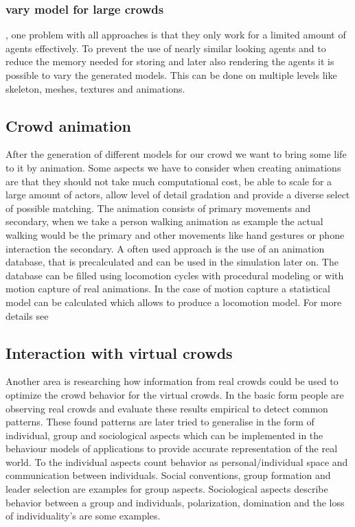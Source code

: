 \documentclass[sigconf]{acmart}
\begin{document}
\subsubsection{vary model for large crowds}, one problem with all approaches is that they only work for a limited amount of agents effectively. To prevent the use of nearly similar looking agents and to reduce the memory needed for storing and later also rendering the agents it is possible to vary the generated models. This can be done on multiple levels like skeleton, meshes, textures and animations. 
\cite{thalmann_crowd_2013}

\subsection{Crowd animation}

After the generation of different models for our crowd we want to bring some life to it by animation. Some aspects we have to consider when creating animations are that they should not take much computational cost,  be able to scale for a large amount of actors, allow level of detail gradation and provide a diverse select of possible matching. The animation consists of primary movements and secondary, when we take a person walking animation as example the actual walking would be the primary and other movements like hand gestures or phone interaction the secondary.
A often used approach is the use of an animation database, that is precalculated and can be used in the simulation later on. The database can be filled using locomotion cycles with procedural modeling or with motion capture of real animations. In the case of motion capture a statistical model can be calculated which allows to produce a locomotion model. For more details see \cite{thalmann_crowd_2013}

\subsection{Interaction with virtual crowds}

Another area is researching how information from real crowds could be used to optimize the crowd behavior for the virtual crowds. In the basic form people are observing real crowds and evaluate these results empirical to detect common patterns. These found patterns are later tried to generalise in the form of individual, group and sociological aspects which can be implemented in the behaviour models of applications to provide accurate representation of the real world. To the individual aspects count behavior as personal/individual space and communication between individuals. Social conventions, group formation and leader selection are examples for group aspects. Sociological aspects describe behavior between a group and individuals, polarization, domination and the loss of individuality's are some examples.  
\end{document}
